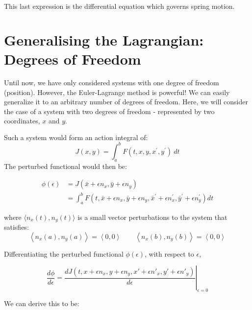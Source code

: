 \documentclass[%
 amsmath,amssymb,
aps,
 fleqn,
 notitlepage,
]{revtex4-2}
\begin{document}
This last expression is the differential equation which governs spring motion.

\section{Generalising the Lagrangian: Degrees of Freedom} %

Until now, we have only considered systems with one degree of freedom (position).  However, the Euler-Lagrange method is powerful!  We can easily generalize it to an arbitrary number of degrees of freedom.  Here, we will consider the case of a system with two degrees of freedom - represented by two coordinates, $x$ and $y$.


Such a system would form an action integral of:
\[
    J(x, y)=\int_{a}^{b} F\left(t, x, y, x^{\prime}, y^{\prime}\right) ~ dt
\]
The perturbed functional would then be:

\begin{align*}
\phi(\epsilon) &=J(\bar{x}+\epsilon n_x, \bar{y}+\epsilon n_y) \\
&=\int_{a}^{b} F\left(t, \bar{x}+\epsilon n_x, \bar{y}+\epsilon n_y, \bar{x}^{\prime}+\epsilon n_x^{\prime}, \bar{y}^{\prime}+\epsilon n_y^{\prime}\right) d t
\end{align*}

where $\langle n_x(t),n_y(t)\rangle$ is a small vector perturbations to the system that satisfies:
\[
    \left\langle n_x(a),n_y(a)\right\rangle = \left\langle 0,0 \right\rangle \qquad \left\langle n_x(b),n_y(b) \right\rangle = \left\langle 0,0 \right\rangle
\]

Differentiating the perturbed functional $\phi(\epsilon)$, with respect to $\epsilon$,

\[
    \frac{d\phi}{d\epsilon} = \left.\frac{d J(t,x+\epsilon n_x, y+\epsilon n_y,x'+\epsilon n'_x,y'+\epsilon n'_y)}{d\epsilon}\right|_{\epsilon=0}
\]

We can derive this to be:
\end{document}
